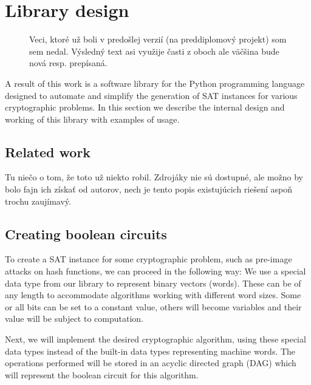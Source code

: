 \chapter{Library design}

\begin{figure}[!t]
\begin{minipage}[t][5cm][t]{.9\textwidth}
\begin{framed}
\noindent Veci, ktoré už boli v predošlej verzií (na preddiplomový projekt) som sem nedal. Výsledný text asi využije časti z oboch ale väčšina bude nová resp. prepísaná.
\end{framed}
\end{minipage}
\vspace{-6cm}
\end{figure}


A result of this work is a software library for the Python programming language designed to automate and simplify the generation of SAT instances for various cryptographic problems.
In this section we describe the internal design and working of this library with examples of usage.

\section{Related work}

\begin{framed}
\noindent Tu niečo o tom, že toto už niekto robil. Zdrojáky nie sú dostupné, ale možno by bolo fajn ich získať od autorov, nech je tento popis existujúcich riešení aspoň trochu zaujímavý.
\end{framed}

\section{Creating boolean circuits}

To create a SAT instance for some cryptographic problem, such as pre-image attacks on hash functions, we can proceed in the following way:
We use a special data type from our library to represent binary vectors (words).
These can be of any length to accommodate algorithms working with different word sizes.
Some or all bits can be set to a constant value, others will become variables and their value will be subject to computation.

Next, we will implement the desired cryptographic algorithm, using these special data types instead of the built-in data types representing machine words.
The operations performed will be stored in an acyclic directed graph (DAG) which will represent the boolean circuit for this algorithm.

